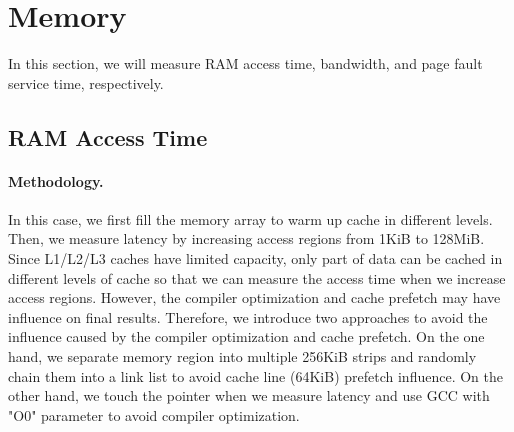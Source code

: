 \section{Memory}
\label{sec:memory}
In this section, we will measure RAM access time, bandwidth, and page fault service time, respectively.

\subsection{RAM  Access Time}
\paragraph{Methodology.}
In this case, we first fill the memory array to 
warm up cache in different levels. Then, we measure latency by increasing 
access regions from 1KiB to 128MiB. Since L1/L2/L3 caches have limited capacity, only part
of data can be cached in different levels of cache so that we can measure the access time when
we increase access regions. However, the compiler optimization and cache prefetch may have influence
on final results. Therefore, we introduce two approaches to avoid the influence caused by the
compiler optimization and cache prefetch. On the one hand, we separate memory region into multiple
256KiB strips and randomly chain them into a link list to avoid cache line (64KiB) prefetch influence.
On the other hand, we touch the pointer when we measure latency and use GCC with "O0" parameter to avoid
compiler optimization.

